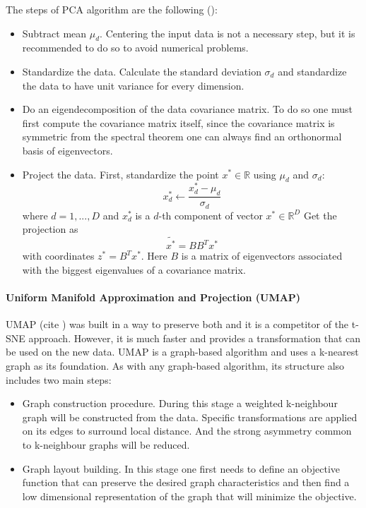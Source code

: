 The steps of PCA algorithm are the following (\cite{mml_book}):
\begin{itemize}
    \item Subtract mean $\mu_d$. Centering the input data is not a necessary step, but it is recommended to do so to avoid numerical problems.
    \item Standardize the data. Calculate the standard deviation $\sigma_d$ and standardize the data to have unit variance for every dimension. 
    \item Do an eigendecomposition of the data covariance matrix. To do so one must first compute the covariance matrix itself, since the covariance matrix is symmetric from the spectral theorem one can always find an orthonormal basis of eigenvectors. 
    \item Project the data. First, standardize the point $x^* \in \mathbb{R}$ using $\mu_d$ and $\sigma_d$:
        \begin{equation}
            x^*_d  \leftarrow \frac{x^*_d - \mu_d}{\sigma_d}
        \end{equation}
        where $d = 1, ..., D$ and $x^*_d$ is a $d$-th component of vector $x^* \in \mathbb{R}^D$
    Get the projection as 
    \begin{equation}
        \tilde{x^*} = BB^T x^*
    \end{equation}
    with coordinates $z^* = B^Tx^*$. Here $B$ is a matrix of eigenvectors associated with the biggest eigenvalues of a covariance matrix.
\end{itemize}

\paragraph{Uniform Manifold Approximation and Projection (UMAP)}
UMAP (cite \cite{McInnes_2020}) was built in a way to preserve both and it is a competitor of the t-SNE approach. However, it is much faster and provides a transformation that can be used on the new data. UMAP is a graph-based algorithm and uses a k-nearest graph as its foundation. As with any graph-based algorithm, its structure also includes two main steps: 

\begin{itemize}
    \item Graph construction procedure. During this stage a weighted k-neighbour graph will be constructed from the data. Specific transformations are applied on its edges to surround local distance. And the strong asymmetry common to k-neighbour graphs will be reduced.
    \item Graph layout building. In this stage one first needs to define an objective function that can preserve the desired graph characteristics and then find a low dimensional representation of the graph that will minimize the objective.
\end{itemize}

